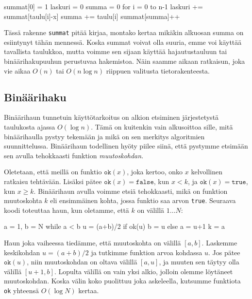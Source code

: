 \begin{code}
summat[0] = 1
laskuri = 0
summa = 0
for i = 0 to n-1
    laskuri += summat[taulu[i]-x]
    summa += taulu[i]
    summat[summa]++
\end{code}

Tässä rakenne \texttt{summat} pitää kirjaa,
montako kertaa mikäkin alkuosan summa on esiintynyt tähän mennessä.
Koska summat voivat olla suuria, emme voi käyttää tavallista taulukkoa,
mutta voimme sen sijaan käyttää hajautustauluun tai binäärihakupuuhun
perustuvaa hakemistoa.
Näin saamme aikaan ratkaisun, joka vie aikaa $O(n)$ tai $O(n \log n)$
riippuen valitusta tietorakenteesta.

\subsection{Binäärihaku}

Binäärihaun tunnetuin käyttötarkoitus on alkion etsiminen
järjestetystä taulukosta ajassa $O(\log n)$.
Tämä on kuitenkin vain alkusoittoa sille,
mitä binää\-rihaulla pystyy tekemään ja mikä on sen
merkitys algoritmien suunnittelussa.
Binääri\-haun todellinen hyöty piilee siinä,
että pystymme etsimään sen avulla tehokkaasti funktion \emph{muutoskohdan}.

Oletetaan, että meillä on funktio $\texttt{ok}(x)$,
joka kertoo, onko $x$ kelvollinen ratkaisu tehtävään.
Lisäksi pätee $\texttt{ok}(x)=\texttt{false}$, kun $x<k$,
ja $\texttt{ok}(x)=\texttt{true}$, kun $x \ge k$.
Binäärihaun avulla voimme etsiä tehokkaasti,
mikä on funktion muutoskohta $k$
eli ensimmäinen kohta, jossa funktio saa arvon \texttt{true}.
Seuraava koodi toteuttaa haun, kun oletamme, että $k$ on välillä $1 \dots N$:

\begin{code}
a = 1, b = N
while a < b
    u = (a+b)/2
    if ok(u)
        b = u
    else
        a = u+1
k = a
\end{code}

Haun joka vaiheessa tiedämme, että muutoskohta on välillä $[a,b]$.
Laskemme keskikohdan $u=(a+b)/2$ ja tutkimme funktion arvoa kohdassa $u$.
Jos pätee $\texttt{ok}(u)$, niin muutoskohdan on oltava välillä $[a,u]$,
ja muuten sen täytyy olla välillä $[u+1,b]$.
Lopulta välillä on vain yksi alkio, jolloin olemme löytäneet muutoskohdan.
Koska välin koko puolittuu joka askeleella,
kutsumme funktiota \texttt{ok} yhteensä $O(\log N)$ kertaa.

